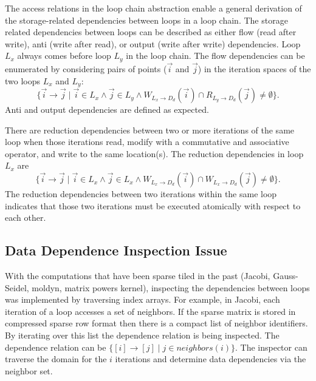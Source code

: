 The access relations in the loop chain abstraction enable a
general derivation of the storage-related dependencies between loops in
a loop chain.  
The storage related dependencies between loops can be described
as either flow (read after write), anti (write after read), or 
output (write after write) dependencies. %
Loop $L_x$ always comes before loop $L_y$ in the loop chain.  
The flow dependencies can be enumerated by considering pairs of points 
($\vec{i}$ and $\vec{j}$) in the iteration spaces of the two loops $L_x$ and $L_y$:
\[
	\{ \vec{i} \rightarrow \vec{j} \; | \; \vec{i} \in L_x \wedge \vec{j} \in L_y \wedge 
	W_{L_x\rightarrow D_d}(\vec{i}) \cap R_{L_y \rightarrow D_d}(\vec{j}) \ne \emptyset \}.
\]
Anti and output dependencies are defined as expected.



There are reduction dependencies between two or more iterations of the same
loop when those iterations read, modify with a commutative and associative operator,
and write to the same location(s).  
The reduction dependencies in loop $L_x$ are 
\[
	\{ \vec{i} \rightarrow \vec{j} \; | \; \vec{i} \in L_x \wedge \vec{j} \in L_x \wedge W_{L_x\rightarrow D_d}(\vec{i}) \cap W_{L_x \rightarrow D_d}(\vec{j}) \ne \emptyset \}.
\]
The reduction dependencies between two iterations within the
same loop indicates that those two iterations must be executed atomically
with respect to each other.



\subsection{Data Dependence Inspection Issue}
\label{sec:infeasible}

With the computations that have been sparse tiled in the past
(Jacobi, Gauss-Seidel, moldyn, matrix powers kernel), inspecting the dependencies
between loops was implemented by traversing index arrays.
For example, in Jacobi, each iteration of a loop accesses a set
of neighbors.  
If the sparse matrix is stored in compressed sparse row format %
then there is a compact list of neighbor identifiers.  By iterating over this list
the dependence relation is being inspected.  The dependence relation can be
	$\{ [i] \rightarrow [j] \; | \; j \in neighbors(i) \}$.
The inspector can traverse the domain for the $i$ %
iterations
and determine data dependencies via
the neighbor set.

